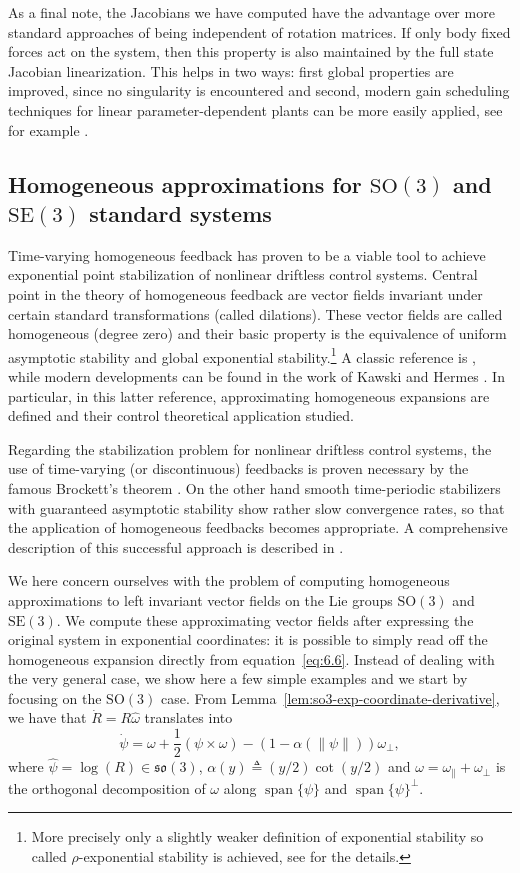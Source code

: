 \documentclass[11pt]{article}
\newcommand{\SO}{\mathrm{SO}}
\newcommand{\SE}{\mathrm{SE}}
\newcommand{\so}{\mathfrak{so}}
\begin{document}
As a final note, the Jacobians we have computed have the advantage over more standard approaches of being independent of rotation matrices. If only body fixed forces act on the system, then this property is also maintained by the full state Jacobian linearization. This helps in two ways: first global properties are improved, since no singularity is encountered and second, modern gain scheduling techniques for linear parameter-dependent plants can be more easily applied, see for example \cite{16,1}.

\subsection{Homogeneous approximations for $\SO(3)$ and $\SE(3)$ standard systems}\label{subsec:homogeneous-approximations}
Time-varying homogeneous feedback has proven to be a viable tool to achieve exponential point stabilization of nonlinear driftless control systems. Central point in the theory of homogeneous feedback are vector fields invariant under certain standard transformations (called dilations). These vector fields are called homogeneous (degree zero) and their basic property is the equivalence of uniform asymptotic stability and global exponential stability.\footnote{More precisely only a slightly weaker definition of exponential stability so called $\rho$-exponential stability is achieved, see \cite{25} for the details.} A classic reference is \cite{11}, while modern developments can be found in the work of Kawski \cite{17} and Hermes \cite{13}. In particular, in this latter reference, approximating homogeneous expansions are defined and their control theoretical application studied.

Regarding the stabilization problem for nonlinear driftless control systems, the use of time-varying (or discontinuous) feedbacks is proven necessary by the famous Brockett's theorem \cite{6}. On the other hand smooth time-periodic stabilizers with guaranteed asymptotic stability show rather slow convergence rates, so that the application of homogeneous feedbacks becomes appropriate. A comprehensive description of this successful approach is described in \cite{25}.

We here concern ourselves with the problem of computing homogeneous approximations to left invariant vector fields on the Lie groups $\SO(3)$ and $\SE(3)$. We compute these approximating vector fields after expressing the original system in exponential coordinates: it is possible to simply read off the homogeneous expansion directly from equation~\eqref{eq:6.6}. Instead of dealing with the very general case, we show here a few simple examples and we start by focusing on the $\SO(3)$ case. From Lemma~\ref{lem:so3-exp-coordinate-derivative}, we have that $\dot R=R\widehat\omega$ translates into
\begin{equation*}
\dot\psi=\omega+\frac12(\psi\times\omega)-(1-\alpha(\|\psi\|))\omega_{\perp},\tag{6.13}\label{eq:6.13}
\end{equation*}
where $\widehat\psi=\log(R)\in\so(3)$, $\alpha(y)\triangleq(y/2)\cot(y/2)$ and $\omega=\omega_{\parallel}+\omega_{\perp}$ is the orthogonal decomposition of $\omega$ along $\operatorname{span}\{\psi\}$ and $\operatorname{span}\{\psi\}^{\perp}$.
\end{document}
